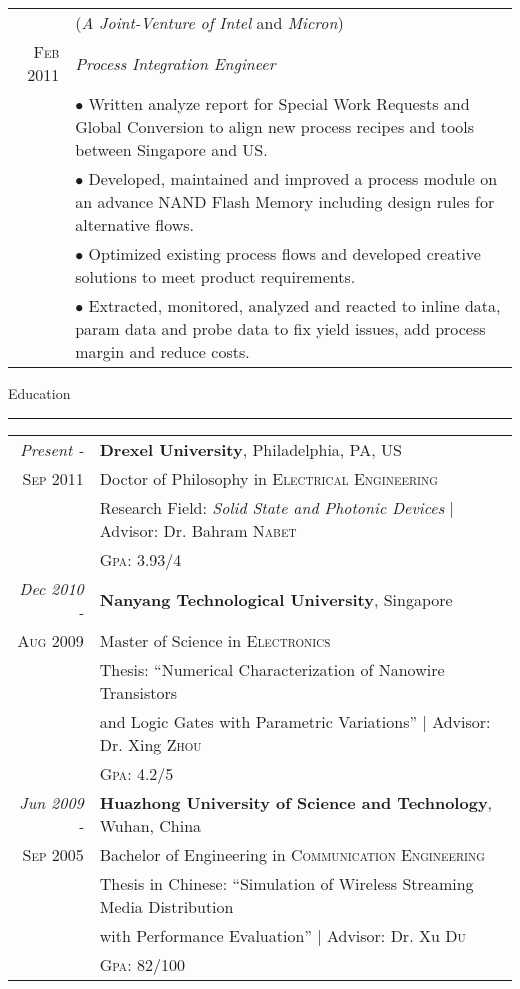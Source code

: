 \begin{vita}
\begin{tabular}{r|p{11cm}}
& (\textit{A Joint-Venture of Intel} and \textit{Micron}) \\
\textsc{Feb 2011} &  \emph{Process Integration Engineer}\\
&\footnotesize{$\bullet$ Written analyze report for Special Work Requests and Global Conversion to align new process recipes and tools between Singapore and US.}\\
&\footnotesize{$\bullet$ Developed, maintained and improved a process module on an advance NAND Flash Memory including design rules for alternative flows.}\\   
&\footnotesize{$\bullet$ Optimized existing process flows and developed creative solutions to meet product requirements.}\\
&\footnotesize{$\bullet$ Extracted, monitored, analyzed and reacted to inline data, param data and probe data to fix yield issues, add process margin and reduce costs.}\\
\end{tabular}

\newpage
{\Large\scshape\raggedright{Education}}
\newline
\rule{\textwidth}{1pt}
\begin{tabular}{rl} 
\emph{Present -} & \textbf{Drexel University}, Philadelphia, PA, US\\
\textsc{Sep} 2011 & Doctor of Philosophy in \textsc{Electrical Engineering}\\ 
& Research Field: \small\emph{Solid State and Photonic Devices} | \small Advisor: Dr. Bahram \textsc{Nabet}\\
&\normalsize \textsc{Gpa}: 3.93/4 \\
\emph{Dec 2010 -} & \textbf{Nanyang Technological University},  Singapore\\
\textsc{Aug} 2009& Master of Science in \textsc{Electronics}\\
& Thesis: ``Numerical Characterization of Nanowire Transistors \\
& and Logic Gates with Parametric Variations'' | \small Advisor: Dr. Xing \textsc{Zhou}\\
&\normalsize \textsc{Gpa}: 4.2/5 \\
\emph{Jun 2009 -} & \textbf{Huazhong University of Science and Technology}, Wuhan, China\\
\textsc{Sep} 2005 & Bachelor of Engineering in \textsc{Communication Engineering}\\
& Thesis in Chinese: ``Simulation of Wireless Streaming Media Distribution \\
& with Performance Evaluation'' | \small Advisor: Dr. Xu \textsc{Du}\\
&\textsc{Gpa}: 82/100 \\
\end{tabular}


\end{vita}
